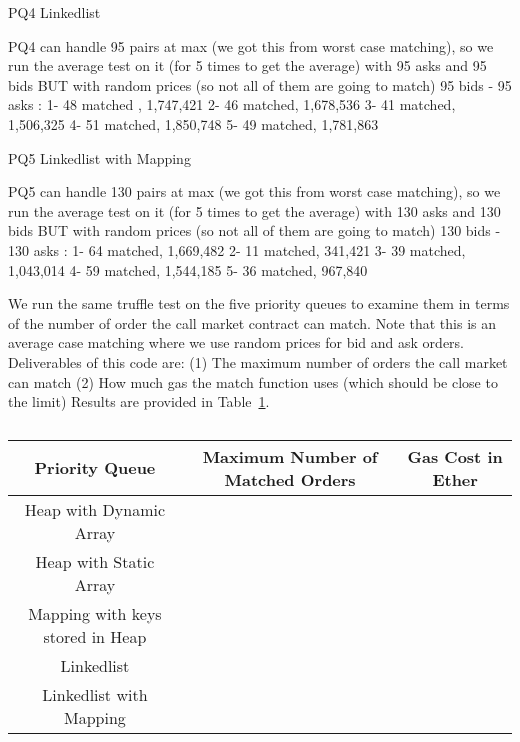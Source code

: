 PQ4 Linkedlist

PQ4 can handle 95 pairs at max (we got this from worst case matching), so we run the average test on it (for 5 times to get the average) with 95 asks and 95 bids BUT with random prices (so not all of them are going to match)
95 bids - 95 asks : 
1- 48 matched , 1,747,421
2- 46 matched, 1,678,536
3- 41 matched, 1,506,325
4- 51 matched, 1,850,748
5- 49 matched, 1,781,863

PQ5 Linkedlist with Mapping

PQ5 can handle 130 pairs at max (we got this from worst case matching), so we run the average test on it (for 5 times to get the average) with 130 asks and 130 bids BUT with random prices (so not all of them are going to match)
130 bids - 130 asks : 
1- 64 matched, 1,669,482
2- 11 matched, 341,421
3- 39 matched, 1,043,014
4- 59 matched, 1,544,185
5- 36 matched, 967,840





 We run the same truffle test on the five priority queues to examine them in terms of the number of order the call market contract can match.
 Note that this is an average case matching where we use random prices for bid and ask orders.
 Deliverables of this code are: (1) The maximum number of orders the call market can match (2) How much gas the match function uses (which should be close to the limit)
Results are provided in Table~\ref{tab:normal_case_matching}.


\begin{table}[t]
\centering
\begin{tabular}{|c|c|c|}
\hline
\textbf{Priority Queue} & \textbf{Maximum Number of Matched Orders} & \textbf{Gas Cost in Ether}  \\ \hline
 
Heap with Dynamic Array &  &  \\ \hline
Heap with Static Array &  &  \\ \hline
Mapping with keys stored in Heap &  &  \\ \hline
Linkedlist &  &  \\ \hline
Linkedlist with Mapping && \\ \hline

\end{tabular}
\caption{\footnotesize{}\label{tab:normal_case_matching}}
\end{table}























